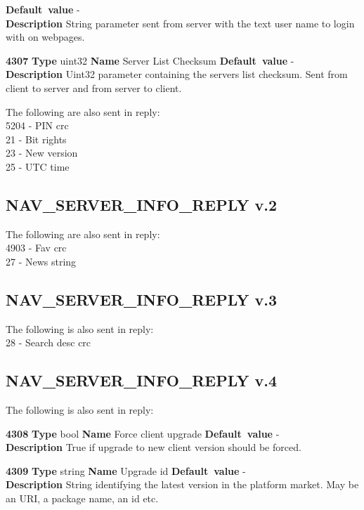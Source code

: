 \begin{list}{\textbf{ParamID}}{}
                 \textbf{Default~value} - \\
  \textbf{Description} String parameter sent from server with the text user 
  name to login with on webpages.
\item \textbf{4307} \textbf{Type} uint32 \textbf{Name} Server List Checksum 
                 \textbf{Default~value} - \\
  \label{Server List Checksum}
  \textbf{Description} Uint32 parameter containing the servers list checksum.
  Sent from client to server and from server to client.
\end{list}

The following are also sent in reply:\\
5204 - PIN crc \\
21 - Bit rights \\
23 - New version \\
25 - UTC time \\


\subsection{NAV\_SERVER\_INFO\_REPLY v.2}

The following are also sent in reply:\\
4903 - Fav crc \\
27 - News string \\

\subsection{NAV\_SERVER\_INFO\_REPLY v.3}

The following is also sent in reply:\\
28 - Search desc crc \\

\subsection{NAV\_SERVER\_INFO\_REPLY v.4}
The following is also sent in reply:
\begin{list}{\textbf{ParamID}}{}
\item \textbf{4308} \textbf{Type} bool \textbf{Name} Force client upgrade
                 \textbf{Default~value} - \\
  \textbf{Description} True if upgrade to new client version should be forced.
\item \textbf{4309} \textbf{Type} string \textbf{Name} Upgrade id
                 \textbf{Default~value} - \\
  \textbf{Description} String identifying the latest version in the platform 
  market. May be an URI, a package name, an id etc.
\end{list}

